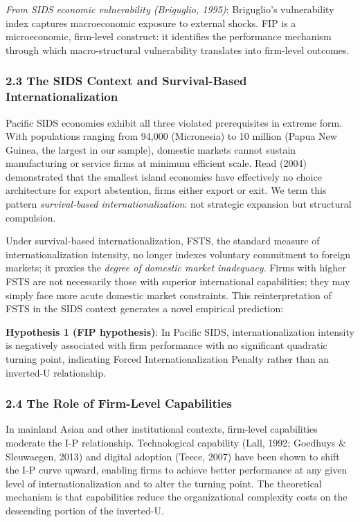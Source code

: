 \documentclass[
  12pt,a4paper]{article}
\begin{document}
\emph{From SIDS economic vulnerability (Briguglio, 1995)}: Briguglio's
vulnerability index captures macroeconomic exposure to external shocks.
FIP is a microeconomic, firm-level construct: it identifies the
performance mechanism through which macro-structural vulnerability
translates into firm-level outcomes.

\hypertarget{the-sids-context-and-survival-based-internationalization}{%
\subsubsection{2.3 The SIDS Context and Survival-Based
Internationalization}\label{the-sids-context-and-survival-based-internationalization}}

Pacific SIDS economies exhibit all three violated prerequisites in
extreme form. With populations ranging from 94,000 (Micronesia) to 10
million (Papua New Guinea, the largest in our sample), domestic markets
cannot sustain manufacturing or service firms at minimum efficient
scale. Read (2004) demonstrated that the smallest island economies have
effectively no choice architecture for export abstention, firms either
export or exit. We term this pattern \emph{survival-based
internationalization}: not strategic expansion but structural
compulsion.

Under survival-based internationalization, FSTS, the standard measure of
internationalization intensity, no longer indexes voluntary commitment
to foreign markets; it proxies the \emph{degree of domestic market
inadequacy}. Firms with higher FSTS are not necessarily those with
superior international capabilities; they may simply face more acute
domestic market constraints. This reinterpretation of FSTS in the SIDS
context generates a novel empirical prediction:

\textbf{Hypothesis 1 (FIP hypothesis)}: In Pacific SIDS,
internationalization intensity is negatively associated with firm
performance with no significant quadratic turning point, indicating
Forced Internationalization Penalty rather than an inverted-U
relationship.

\hypertarget{the-role-of-firm-level-capabilities}{%
\subsubsection{2.4 The Role of Firm-Level
Capabilities}\label{the-role-of-firm-level-capabilities}}

In mainland Asian and other institutional contexts, firm-level
capabilities moderate the I-P relationship. Technological capability
(Lall, 1992; Goedhuys \& Sleuwaegen, 2013) and digital adoption (Teece,
2007) have been shown to shift the I-P curve upward, enabling firms to
achieve better performance at any given level of internationalization
and to alter the turning point. The theoretical mechanism is that
capabilities reduce the organizational complexity costs on the
descending portion of the inverted-U.
\end{document}

